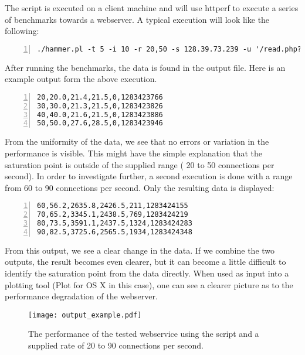 The script is executed on a client machine and will use httperf to execute a series of benchmarks towards a webserver. A typical execution will look like the following: 

\begin{Verbatim}[commandchars=\\\{\},numbers=left,label=hammer.pl execution example]
./hammer.pl -t 5 -i 10 -r 20,50 -s 128.39.73.239 -u '/read.php?file=load1024' -l 60 -c 5 -o out.dat
\end{Verbatim}

After running the benchmarks, the data is found in the output file. Here is an example output form the above execution. 

\begin{Verbatim}[commandchars=\\\{\},numbers=left,label=Output example: range 20 to 50]
20,20.0,21.4,21.5,0,1283423766
30,30.0,21.3,21.5,0,1283423826
40,40.0,21.6,21.5,0,1283423886
50,50.0,27.6,28.5,0,1283423946
\end{Verbatim}

From the uniformity of the data, we see that no errors or variation in the performance is visible. This might have the simple explanation that the saturation point is outside of the supplied range ( 20 to 50 connections per second). In order to investigate further, a second execution is done with a range from 60 to 90 connections per second. Only the resulting data is displayed: 

\begin{Verbatim}[commandchars=\\\{\},numbers=left,label=Output example: range 60 to 90]
60,56.2,2635.8,2426.5,211,1283424155
70,65.2,3345.1,2438.5,769,1283424219
80,73.5,3591.1,2437.5,1324,1283424283
90,82.5,3725.6,2565.5,1934,1283424348
\end{Verbatim}

From this output, we see a clear change in the data. If we combine the two outputs, the result becomes even clearer, but it can become a little difficult to identify the saturation point from the data directly. When used as input into a plotting tool (Plot for OS X in this case), one can see a clearer picture as to the performance degradation of the webserver. 

\begin{figure}[ht!]
\begin{centering}
\texttt{[image: output\_example.pdf]}
\caption{The performance of the tested webservice using the script and a supplied rate of 20 to 90 connections per second.}
\label{weboutput}
\end{centering}
\end{figure}

